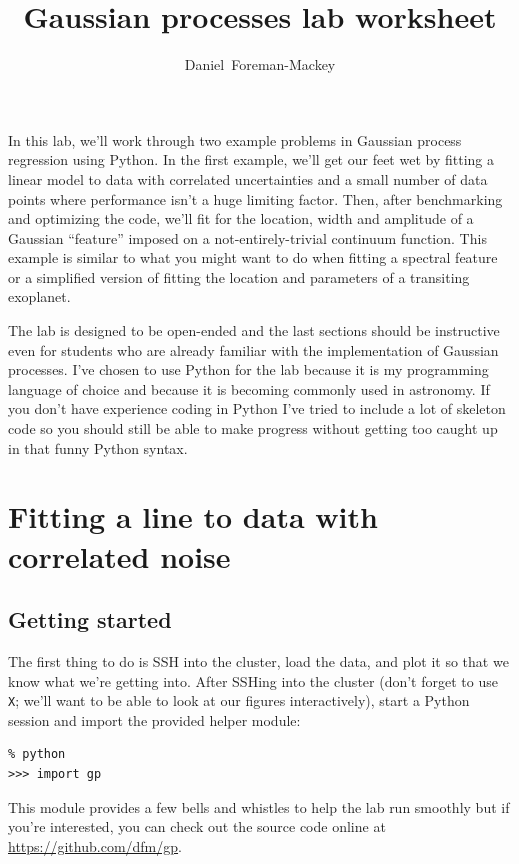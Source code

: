\documentclass[12pt,preprint]{aastex}
\begin{document}
\title{%
    Gaussian processes lab worksheet
}

\author{%
    Daniel~Foreman-Mackey
}

In this lab, we'll work through two example problems in Gaussian process
regression using Python.
In the first example, we'll get our feet wet by fitting a linear model to data
with correlated uncertainties and a small number of data points where
performance isn't a huge limiting factor.
Then, after benchmarking and optimizing the code, we'll fit for the location,
width and amplitude of a Gaussian ``feature'' imposed on a
not-entirely-trivial continuum function.
This example is similar to what you might want to do when fitting a spectral
feature or a simplified version of fitting the location and parameters of a
transiting exoplanet.

The lab is designed to be open-ended and the last sections should be
instructive even for students who are already familiar with the implementation
of Gaussian processes.
I've chosen to use Python for the lab because it is my programming language of
choice and because it is becoming commonly used in astronomy.
If you don't have experience coding in Python I've tried to include a lot of
skeleton code so you should still be able to make progress without getting too
caught up in that funny Python syntax.

\section{Fitting a line to data with correlated noise}

\subsection{Getting started}

The first thing to do is SSH into the cluster, load the data, and plot it so
that we know what we're getting into.
After SSHing into the cluster (don't forget to use \texttt{X}; we'll want to
be able to look at our figures interactively), start a Python session and
import the provided helper module:
\begin{lstlisting}
% python
>>> import gp
\end{lstlisting}
This module provides a few bells and whistles to help the lab run smoothly but
if you're interested, you can check out the source code online at
\url{https://github.com/dfm/gp}.
\end{document}
